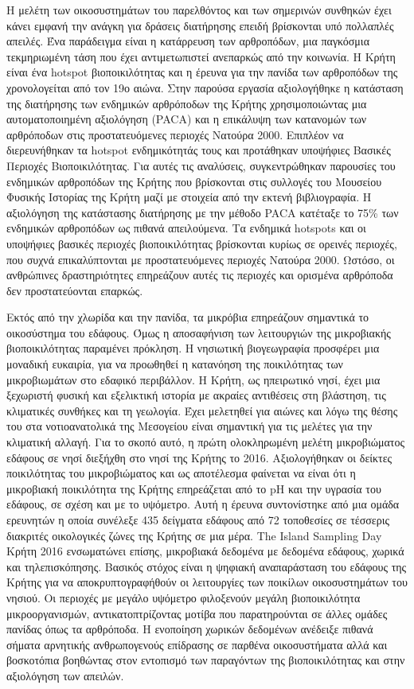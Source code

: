 \documentclass[11pt]{article}
\begin{document}
Η μελέτη των οικοσυστημάτων του παρελθόντος και των σημερινών συνθηκών έχει κάνει εμφανή την ανάγκη για
δράσεις διατήρησης επειδή βρίσκονται υπό πολλαπλές απειλές.
Ένα παράδειγμα είναι η κατάρρευση των αρθροπόδων, μια παγκόσμια τεκμηριωμένη
τάση που έχει αντιμετωπιστεί ανεπαρκώς από την κοινωνία.
Η Κρήτη είναι ένα hotspot βιοποικιλότητας και η έρευνα για την πανίδα των αρθροπόδων της χρονολογείται από τον 19ο αιώνα.
Στην παρούσα εργασία αξιολογήθηκε η κατάσταση της διατήρησης των ενδημικών αρθρόποδων της Κρήτης χρησιμοποιώντας
μια αυτοματοποιημένη αξιολόγηση (\textlatin{PACA}) και η επικάλυψη των κατανομών των αρθρόποδων
στις προστατευόμενες περιοχές Νατούρα 2000. Επιπλέον 
να διερευνήθηκαν τα \textlatin{hotspot} ενδημικότητάς τους και προτάθηκαν υποψήφιες Βασικές Περιοχές Βιοποικιλότητας.
Για αυτές τις αναλύσεις, συγκεντρώθηκαν παρουσίες του ενδημικών αρθροπόδων της Κρήτης
που βρίσκονται στις συλλογές του Μουσείου Φυσικής Ιστορίας της
Κρήτη μαζί με στοιχεία από την εκτενή βιβλιογραφία. Η αξιολόγηση της κατάστασης διατήρησης με την μέθοδο \textlatin{PACA}
κατέταξε το 75\% των ενδημικών αρθροπόδων ως πιθανά απειλούμενα.
Τα ενδημικά \textlatin{hotspots} και οι υποψήφιες βασικές περιοχές βιοποικιλότητας βρίσκονται κυρίως σε
ορεινές περιοχές, που συχνά επικαλύπτονται με προστατευόμενες περιοχές Νατούρα 2000.
Ωστόσο, οι ανθρώπινες δραστηριότητες επηρεάζουν αυτές τις περιοχές και ορισμένα αρθρόποδα δεν 
προστατεύονται επαρκώς.

Εκτός από την χλωρίδα και την πανίδα, τα μικρόβια επηρεάζουν σημαντικά το οικοσύστημα του εδάφους.
Όμως η αποσαφήνιση των λειτουργιών της μικροβιακής βιοποικιλότητας παραμένει πρόκληση.
Η νησιωτική βιογεωγραφία προσφέρει μια μοναδική ευκαιρία, για να προωθηθεί η κατανόηση
της ποικιλότητας των μικροβιωμάτων στο εδαφικό περιβάλλον.
Η Κρήτη, ως ηπειρωτικό νησί, έχει μια ξεχωριστή φυσική και εξελικτική ιστορία
με ακραίες αντιθέσεις στη βλάστηση, τις κλιματικές συνθήκες και τη γεωλογία.
Έχει μελετηθεί για αιώνες και λόγω της θέσης του στα νοτιοανατολικά
της Μεσογείου είναι σημαντική για τις μελέτες για την κλιματική αλλαγή.
Για το σκοπό αυτό, η πρώτη ολοκληρωμένη μελέτη μικροβιώματος εδάφους σε νησί διεξήχθη στο
νησί της Κρήτης το 2016. Αξιολογήθηκαν οι δείκτες ποικιλότητας του μικροβιώματος και ως αποτέλεσμα
φαίνεται να είναι ότι η μικροβιακή ποικιλότητα της Κρήτης επηρεάζεται από το \textlatin{pH} και
την υγρασία του εδάφους, σε σχέση και με το υψόμετρο. Αυτή η έρευνα συντονίστηκε από μια ομάδα ερευνητών η οποία συνέλεξε 435 δείγματα εδάφους
από 72 τοποθεσίες σε τέσσερις διακριτές οικολογικές ζώνες της Κρήτης σε μια μέρα. The \textlatin{Island Sampling Day} Κρήτη 2016
ενσωματώνει επίσης, μικροβιακά δεδομένα με δεδομένα εδάφους, χωρικά και τηλεπισκόπησης.
Βασικός στόχος είναι η ψηφιακή αναπαράσταση του εδάφους της Κρήτης για να αποκρυπτογραφήθούν
οι λειτουργίες των ποικίλων οικοσυστημάτων του νησιού. Οι περιοχές με μεγάλο υψόμετρο φιλοξενούν μεγάλη βιοποικιλότητα
μικροοργανισμών, αντικατοπτρίζοντας μοτίβα που παρατηρούνται σε άλλες ομάδες πανίδας όπως τα αρθρόποδα.
Η ενοποίηση χωρικών δεδομένων ανέδειξε πιθανά σήματα αρνητικής ανθρωπογενούς επίδρασης σε παρθένα οικοσυστήματα αλλά και 
βοσκοτόπια βοηθώντας στον εντοπισμό των παραγόντων της βιοποικιλότητας και στην αξιολόγηση των απειλών.
\end{document}
